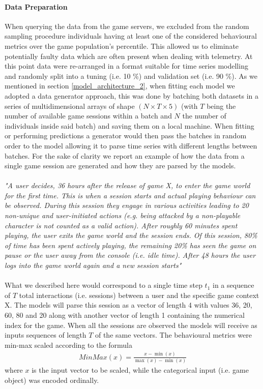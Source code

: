 \paragraph*{Data Preparation} When querying the data from the game servers, we excluded from the random sampling procedure individuals having at least one of the considered behavioural metrics over the game population's  percentile. This allowed us to eliminate potentially faulty data which are often present when dealing with telemetry. At this point data were re-arranged in a format suitable for time series modelling and randomly split into a tuning (i.e. 10 \%) and validation set (i.e. 90 \%). As we mentioned in section \ref{model_architecture_2}, when fitting each model we adopted a data generator approach, this was done by batching both datasets in a series of multidimensional arrays of shape $(N \times T \times 5)$ (with $T$ being the number of available game sessions within a batch and $N$ the number of individuals inside said batch) and saving them on a local machine. When fitting or performing predictions a generator would then pass the batches in random order to the model allowing it to parse time series with different lengths between batches. For the sake of clarity we report an example of how the data from a single game session are generated and how they are parsed by the models.\\
\\
\textit{
"A user decides, 36 hours after the release of game X, to enter the game world for the first time. This is when a session starts and actual playing behaviour can be observed. During this session they engage in various activities leading to 20 non-unique and user-initiated actions (e.g. being attacked by a non-playable character is not counted as a valid action). After roughly 60 minutes spent playing, the user exits the game world and the session ends. Of this session, 80\% of time has been spent actively playing, the remaining 20\% has seen the game on pause or the user away from the console (i.e. idle time). After 48 hours the user logs into the game world again and a new session starts"}\\
\\
What we described here would correspond to a single time step $t_{1}$ in a sequence of $T$ total interactions (i.e. sessions) between a user and the specific game context X. The models will parse this session as a vector of length 4 with values 36, 20, 60, 80 and 20 along with another vector of length 1 containing the numerical index for the game. When all the sessions are observed the models will receive as inputs sequences of length $T$ of the same vectors. The behavioural metrics were min-max scaled according to the formula
\begin{equation}
  \begin{gathered} 
  \label{min_max}
        MinMax(x) =\frac{x - \min(x)} {\max(x) - \min(x)} 
  \end{gathered}
\end{equation}
where $x$ is the input vector to be scaled, while the categorical input (i.e. game object) was encoded ordinally.

